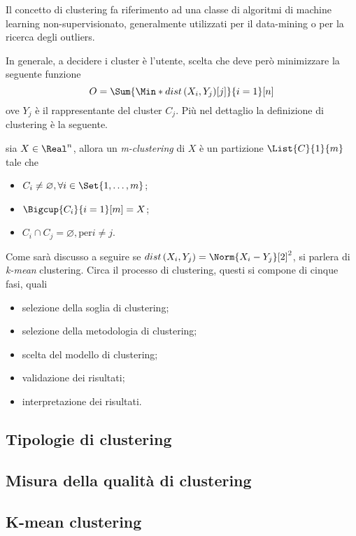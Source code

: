 \documentclass{subfiles}
\begin{document}
Il concetto di clustering fa riferimento ad una classe di algoritmi di machine learning non-supervisionato,
generalmente utilizzati per il data-mining o per la ricerca degli outliers\footnotemark[1].

In generale, a decidere i cluster è l'utente, scelta che deve però minimizzare la seguente funzione
$$
    O = \Sum{\Min*{dist\left(X_{i}, Y_{j}\right)}[j]}{i = 1}[n]
$$
ove $Y_{j}$ è il rappresentante del cluster $C_{j}$.
Più nel dettaglio la definizione di clustering è la seguente.
\begin{Definition*}
    sia $X \in \Real^{n}$, allora un \emph{m-clustering} di $X$ è un partizione $\List{C}{1}{m}$ tale che
    \begin{itemize}
        \item $C_{i} \neq \varnothing, \forall i \in \Set{1, \dots, m}$;
        \item $\Bigcup{C_{i}}{i = 1}[m] = X$;
        \item $C_{i} \cap C_{j} = \varnothing, \text{per} i \neq j$.
    \end{itemize}
\end{Definition*}
Come sarà discusso a seguire se $dist\left(X_{i}, Y_{j}\right) = \Norm{X_{i} - Y_{j}}[2]^{2}$, si parlera di \emph{k-mean} clustering.
Circa il processo di clustering, questi si compone di cinque fasi, quali
\begin{itemize}
    \item selezione della soglia di clustering;
    \item selezione della metodologia di clustering;
    \item scelta del modello di clustering;
    \item validazione dei risultati;
    \item interpretazione dei risultati.
\end{itemize}

\subsection{Tipologie di clustering}


\subsection{Misura della qualità di clustering}


\subsection{K-mean clustering}


\clearpage
\end{document}
